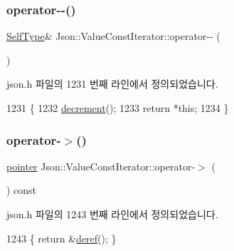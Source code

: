 \subsubsection{\texorpdfstring{operator-\/-\/()}{operator--()}\hspace{0.1cm}{\footnotesize\ttfamily [2/2]}}
{\footnotesize\ttfamily \hyperlink{class_json_1_1_value_iterator_base_a9d2a940d03ea06d20d972f41a89149ee}{Self\+Type}\& Json\+::\+Value\+Const\+Iterator\+::operator-\/-\/ (\begin{DoxyParamCaption}{ }\end{DoxyParamCaption})\hspace{0.3cm}{\ttfamily [inline]}}



json.\+h 파일의 1231 번째 라인에서 정의되었습니다.


\begin{DoxyCode}
1231                          \{
1232     \hyperlink{class_json_1_1_value_iterator_base_affc8cf5ff54a9f432cc693362c153fa6}{decrement}();
1233     \textcolor{keywordflow}{return} *\textcolor{keyword}{this};
1234   \}
\end{DoxyCode}
\mbox{\label{class_json_1_1_value_const_iterator_a3c608ae53c192ee846eb265bae1cfeec}} 
\subsubsection{\texorpdfstring{operator-\/$>$()}{operator->()}}
{\footnotesize\ttfamily \hyperlink{class_json_1_1_value_const_iterator_a400136bd8bc09e9fddec0785fa2cff14}{pointer} Json\+::\+Value\+Const\+Iterator\+::operator-\/$>$ (\begin{DoxyParamCaption}{ }\end{DoxyParamCaption}) const\hspace{0.3cm}{\ttfamily [inline]}}



json.\+h 파일의 1243 번째 라인에서 정의되었습니다.


\begin{DoxyCode}
1243 \{ \textcolor{keywordflow}{return} &\hyperlink{class_json_1_1_value_iterator_base_aa5b75c9514a30ba2ea3c9a35c165c18e}{deref}(); \}
\end{DoxyCode}
\mbox{\label{class_json_1_1_value_const_iterator_ad1b1c11f8d7fb22d4d3c231915f2b15b}} 
